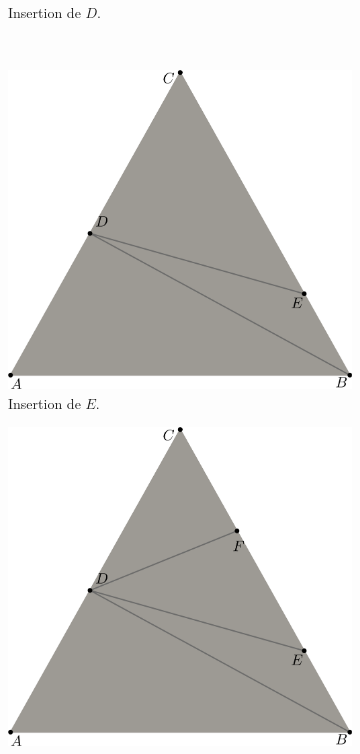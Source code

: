\begin{figure}[h!]
\begin{subfigure}{0.45\textwidth}
    \caption{Insertion de $D$.}
    \label{fig:exemple_insert_pt_1}
\end{subfigure}
\\[0.5cm]
\begin{subfigure}{0.45\textwidth}
    \includegraphics[width=\textwidth]{images/decoup_triangle-2.pdf}
    \caption{Insertion de $E$.}
    \label{fig:exemple_insert_pt_2}
\end{subfigure}
\hfill
\begin{subfigure}{0.45\textwidth}
    \includegraphics[width=\textwidth]{images/decoup_triangle-3.pdf}

\end{subfigure}
\end{figure}
